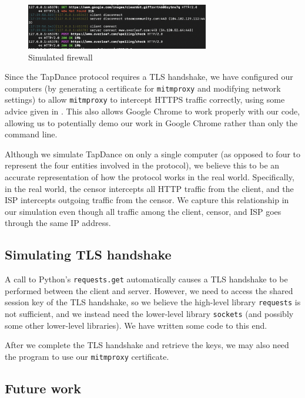 \documentclass[conference]{IEEEtran}
\begin{document}
\begin{figure}[htp]
    \centering
    \includegraphics[width=8cm]{img/censor_example.png}
    \caption{Simulated firewall}
    \label{censor_sim}
\end{figure}

Since the TapDance protocol requires a TLS handshake, we have configured our computers (by generating a certificate for \texttt{mitmproxy} and modifying network settings) to allow \texttt{mitmproxy} to intercept HTTPS traffic correctly, using some advice given in \cite{mitmproxy_firewall}. This also allows Google Chrome to work properly with our code, allowing us to potentially demo our work in Google Chrome rather than only the command line.

Although we simulate TapDance on only a single computer (as opposed to four to represent the four entities involved in the protocol), we believe this to be an accurate representation of how the protocol works in the real world. Specifically, in the real world, the censor intercepts all HTTP traffic from the client, and the ISP intercepts outgoing traffic from the censor. We capture this relationship in our simulation even though all traffic among the client, censor, and ISP goes through the same IP address.

\subsection{Simulating TLS handshake}

A call to Python's \texttt{requests.get} automatically causes a TLS handshake to be performed between the client and server. However, we need to access the shared session key of the TLS handshake, so we believe the high-level library \texttt{requests} is not sufficient, and we instead need the lower-level library \texttt{sockets} (and possibly some other lower-level libraries). We have written some code to this end.

After we complete the TLS handshake and retrieve the keys, we may also need the program to use our \texttt{mitmproxy} certificate.

\subsection{Future work}
\end{document}
